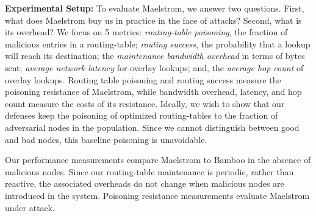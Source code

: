 \documentclass[10pt,twocolumn]{article}
\renewcommand{\paragraph}[1]{\textbf{#1:}}
\begin{document}
\paragraph{Experimental Setup}
To evaluate Maelstrom, we answer two questions.  First,
what does Maelstrom buy us in practice in the face of attacks?  Second,
what is its overhead?  We focus on 5 metrics: \emph{routing-table
poisoning}, the fraction of malicious entries in a routing-table;
\emph{routing success}, the probability that a lookup will reach its
destination; the \emph{maintenance bandwidth overhead} in terms of bytes
sent; \emph{average network latency} for overlay lookups; and, the
\emph{average hop count} of overlay lookups.
Routing table poisoning and routing success measure the poisoning
resistance of Maelstrom, while bandwidth overhead, latency, and hop
count measure the costs of its resistance.  Ideally, we wish to show that our
defenses keep the poisoning of optimized routing-tables to the fraction of adversarial nodes
in the population.  Since we cannot distinguish between good and bad
nodes, this baseline poisoning is unavoidable.

Our performance measurements compare Maelstrom 
to Bamboo in the absence of malicious nodes.  Since our routing-table maintenance
is periodic, rather than reactive, the associated overheads do not change when
malicious nodes are introduced in the system.  Poisoning resistance
measurements evaluate Maelstrom under attack.
\end{document}
